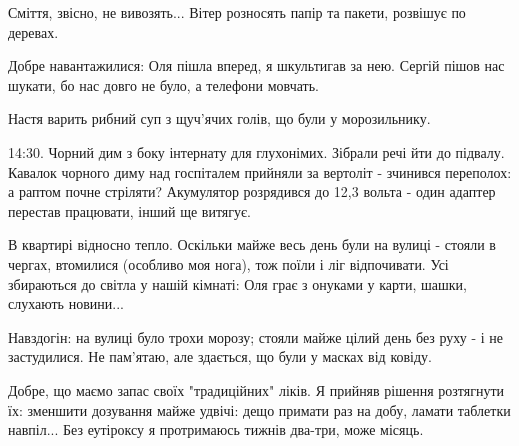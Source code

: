 Сміття, звісно, не вивозять... Вітер розносять папір та пакети,   розвішує по
деревах.

Добре навантажилися: Оля пішла вперед, я шкультигав за нею. Сергій пішов нас
шукати, бо нас довго не було, а телефони мовчать. 

Настя варить рибний суп з щуч'ячих голів, що були у морозильнику.

14:30. Чорний дим з боку інтернату для глухонімих. Зібрали речі йти до підвалу.
Кавалок чорного диму над госпіталем прийняли за вертоліт - зчинився переполох:
а раптом почне стріляти? Акумулятор розрядився до 12,3 вольта - один адаптер
перестав працювати, інший ще витягує.

В квартирі відносно тепло. Оскільки майже весь день були на вулиці - стояли в
чергах, втомилися (особливо моя нога), тож поїли і ліг відпочивати. Усі
збираються до світла у нашій кімнаті: Оля грає з онуками у карти, шашки,
слухають новини...

Навздогін: на вулиці було трохи морозу; стояли майже цілий день без руху - і не
застудилися. Не пам'ятаю, але здається, що були у масках від ковіду. 

Добре, що маємо запас своїх "традиційних" ліків. Я прийняв рішення розтягнути
їх: зменшити дозування майже удвічі: дещо примати раз на добу, ламати таблетки
навпіл... Без еутіроксу я протримаюсь тижнів два-три, може місяць.
